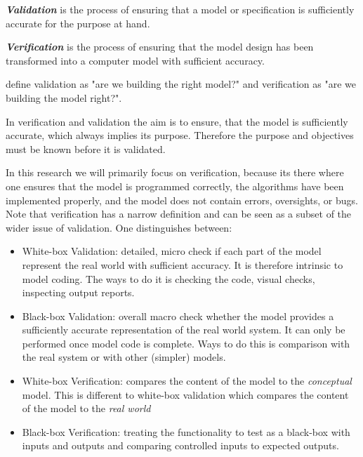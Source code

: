 
\textbf{\textit{Validation}} is the process of ensuring that a model or specification is sufficiently accurate for the purpose at hand.

\textbf{\textit{Verification}} is the process of ensuring that the model design has been transformed into a computer model with sufficient accuracy.

\cite{balci_verification_1998} define validation as "are we building the right model?" and verification as "are we building the model right?".

In verification and validation the aim is to ensure, that the model is sufficiently accurate, which always implies its purpose. Therefore the purpose and objectives must be known before it is validated. 

In this research we will primarily focus on verification, because its there where one ensures that the model is programmed correctly, the algorithms have been implemented properly, and the model does not contain errors, oversights, or bugs. Note that verification has a narrow definition and can be seen as a subset of the wider issue of validation. One distinguishes between:

\begin{itemize}
	\item White-box Validation: detailed, micro check if each part of the model represent the real world with sufficient accuracy. It is therefore intrinsic to model coding. The ways to do it is checking the code, visual checks, inspecting output reports. 
	\item Black-box Validation: overall macro check whether the model provides a sufficiently accurate representation of the real world system. It can only be performed once model code is complete. Ways to do this is comparison with the real system or with other (simpler) models.

	\item White-box Verification: compares the content of the model to the \textit{conceptual} model. This is different to white-box validation which compares the content of the model to the \textit{real world}
	\item Black-box Verification: treating the functionality to test as a black-box with inputs and outputs and comparing controlled inputs to expected outputs.

\end{itemize}

